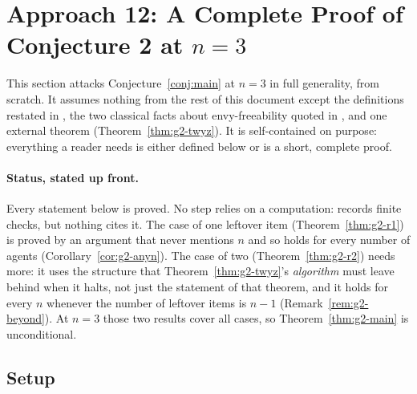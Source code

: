 \section{Approach 12: A Complete Proof of Conjecture 2 at \texorpdfstring{$n=3$}{n=3}}
\label{sec:approach12}

This section attacks Conjecture~\ref{conj:main} at $n=3$ in full generality,
from scratch. It assumes nothing from the rest of this document except the
definitions restated in , the two classical facts about
envy-freeability quoted in , and one external theorem
(Theorem~\ref{thm:g2-twyz}). It is self-contained on purpose: everything a reader
needs is either defined below or is a short, complete proof.

\paragraph{Status, stated up front.} Every statement below is proved. No
step relies on a computation:  records finite
checks, but nothing cites it. The case of one leftover item
(Theorem~\ref{thm:g2-r1}) is proved by an argument that never mentions $n$ and so
holds for every number of agents (Corollary~\ref{cor:g2-anyn}). The case of two
(Theorem~\ref{thm:g2-r2}) needs more: it uses the structure that
Theorem~\ref{thm:g2-twyz}'s \emph{algorithm} must leave behind when it halts, not
just the statement of that theorem, and it holds for every $n$ whenever the
number of leftover items is $n-1$ (Remark~\ref{rem:g2-beyond}). At $n=3$ those two
results cover all cases, so Theorem~\ref{thm:g2-main} is unconditional.

\subsection{Setup}
\label{sec:g2-setup}

